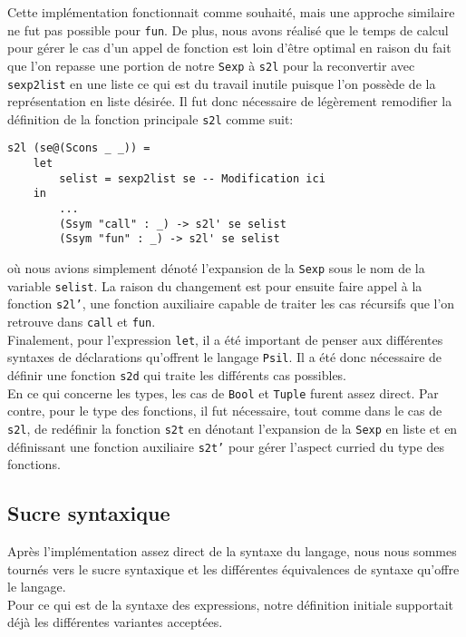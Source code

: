 \documentclass[11pt, titlepage]{article}
\begin{document}
Cette implémentation fonctionnait comme souhaité, mais une approche similaire
ne fut pas possible pour \texttt{fun}. De plus, nous avons réalisé que le temps
de calcul pour gérer le cas d'un appel de fonction est loin d'être optimal en
raison du fait que l'on repasse une portion de notre \texttt{Sexp} à
\texttt{s2l} pour la reconvertir avec \texttt{sexp2list} en une liste ce qui
est du travail inutile puisque l'on possède de la représentation en liste
désirée. Il fut donc nécessaire de légèrement remodifier la définition de la
fonction principale \texttt{s2l} comme suit:
\begin{lstlisting}
s2l (se@(Scons _ _)) =
    let
        selist = sexp2list se -- Modification ici
    in
        ...
        (Ssym "call" : _) -> s2l' se selist
        (Ssym "fun" : _) -> s2l' se selist
\end{lstlisting}
où nous avions simplement dénoté l'expansion de la \texttt{Sexp} sous le nom de
la variable \texttt{selist}. La raison du changement est pour ensuite faire
appel à la fonction \texttt{s2l'}, une fonction auxiliaire capable de traiter
les cas récursifs que l'on retrouve dans \texttt{call} et \texttt{fun}. \\
Finalement, pour l'expression \texttt{let}, il a été important de penser aux
différentes syntaxes de déclarations qu'offrent le langage \texttt{Psil}. Il a
été donc nécessaire de définir une fonction \texttt{s2d} qui traite les
différents cas possibles. \\

En ce qui concerne les types, les cas de \texttt{Bool} et \texttt{Tuple} furent
assez direct. Par contre, pour le type des fonctions, il fut nécessaire, tout
comme dans le cas de \texttt{s2l}, de redéfinir la fonction \texttt{s2t} en
dénotant l'expansion de la \texttt{Sexp} en liste et en définissant une
fonction auxiliaire \texttt{s2t'} pour gérer l'aspect curried du type des
fonctions.

\subsection{Sucre syntaxique}

Après l'implémentation assez direct de la syntaxe du langage, nous nous sommes
tournés vers le sucre syntaxique et les différentes équivalences de syntaxe
qu'offre le langage. \\

Pour ce qui est de la syntaxe des expressions, notre définition initiale
supportait déjà les différentes variantes acceptées. \\
\end{document}
